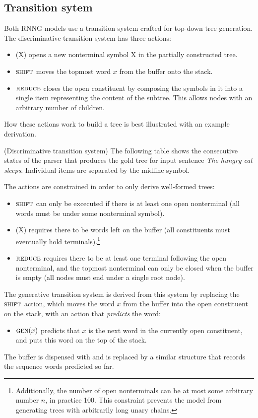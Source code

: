   \subsection{Transition sytem}
    Both RNNG models use a transition system crafted for top-down tree generation. The discriminative transition system has three actions:
    \begin{itemize}
      \item \open(X) opens a new nonterminal symbol X in the partially constructed tree.
      \item $\textsc{shift}$ moves the topmost word $x$ from the buffer onto the stack.
      \item $\textsc{reduce}$ closes the open constituent by composing the symbols in it into a single item representing the content of the subtree. This allows nodes with an arbitrary number of children.
    \end{itemize}
    How these actions work to build a tree is best illustrated with an example derivation.

    \begin{example}{(Discriminative transition system)}
      \label{ex:disc-states}
      The following table shows the consecutive states of the parser that produces the gold tree for input sentence \textit{The hungry cat sleeps}. Individual items are separated by the midline symbol.
      
    \end{example}

     The actions are constrained in order to only derive well-formed trees:
    \begin{itemize}
      \item $\textsc{shift}$ can only be excecuted if there is at least one open nonterminal (all words must be under some nonterminal symbol).
      \item \open(X) requires there to be words left on the buffer (all constituents must eventually hold terminals).\footnote{Additionally, the number of open nonterminals can be at most some arbitrary number $n$, in practice 100. This constraint prevents the model from generating trees with arbitrarily long unary chains.}
      \item $\textsc{reduce}$ requires there to be at least one terminal following the open nonterminal, and the topmost nonterminal can only be closed when the buffer is empty (all nodes must end under a single root node).
    \end{itemize}
    The generative transition system is derived from this system by replacing the $\textsc{shift}$ action, which moves the word $x$ from the buffer into the open constituent on the stack, with an action that \textit{predicts} the word:
    \begin{itemize}
      \item $\textsc{gen}(x)$ predicts that $x$ is the next word in the currently open constituent, and puts this word on the top of the stack.
    \end{itemize}
    The buffer is dispensed with and is replaced by a similar structure that records the sequence words predicted so far.

